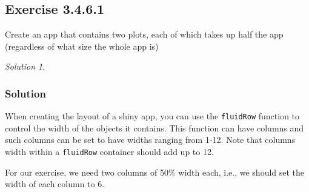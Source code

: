 \documentclass[
]{book}
\newenvironment{Shaded}{\begin{snugshade}}{\end{snugshade}}
\newcommand{\AttributeTok}[1]{\textcolor[rgb]{0.77,0.63,0.00}{#1}}
\newcommand{\ControlFlowTok}[1]{\textcolor[rgb]{0.13,0.29,0.53}{\textbf{#1}}}
\newcommand{\DecValTok}[1]{\textcolor[rgb]{0.00,0.00,0.81}{#1}}
\newcommand{\FunctionTok}[1]{\textcolor[rgb]{0.00,0.00,0.00}{#1}}
\newcommand{\NormalTok}[1]{#1}
\newcommand{\OtherTok}[1]{\textcolor[rgb]{0.56,0.35,0.01}{#1}}
\newcommand{\SpecialCharTok}[1]{\textcolor[rgb]{0.00,0.00,0.00}{#1}}
\newcommand{\StringTok}[1]{\textcolor[rgb]{0.31,0.60,0.02}{#1}}
\theoremstyle{definition}
\theoremstyle{definition}
\theoremstyle{definition}
\theoremstyle{definition}
\theoremstyle{remark}
\newtheorem*{solution}{Solution}
\begin{document}
\hypertarget{exercise-3.4.6.1}{%
\subsection*{Exercise 3.4.6.1}\label{exercise-3.4.6.1}}

Create an app that contains two plots, each of which takes up half the app (regardless of what size the whole app is)

\begin{solution}
\leavevmode

\hypertarget{solution-12}{%
\subsubsection*{Solution}\label{solution-12}}

When creating the layout of a shiny app, you can use the \texttt{fluidRow} function to
control the width of the objects it contains. This function can have columns
and such columns can be set to have widths ranging from 1-12. Note that columns
width within a \texttt{fluidRow} container should add up to 12.

For our exercise, we need two columns of 50\% width each, i.e., we should set
the width of each column to 6.

\begin{Shaded}
\end{Shaded}

\end{solution}
\end{document}
